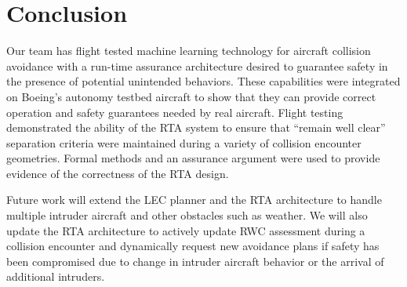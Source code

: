 \section{Conclusion}

%
%


Our team has flight tested machine learning technology for aircraft collision avoidance with a
run-time assurance architecture desired to guarantee safety in the presence of potential
unintended behaviors.  These capabilities were integrated on Boeing's
autonomy testbed aircraft to show that they can provide correct operation and
safety guarantees needed by real aircraft.  Flight testing demonstrated the ability of the RTA
system to ensure that ``remain well clear'' separation criteria were maintained during a variety of 
collision encounter geometries.  Formal methods and an assurance argument were used to 
provide evidence of the correctness of the RTA design. 

Future work will extend the LEC planner and the RTA architecture to handle multiple intruder 
aircraft and other obstacles such as weather.  We will also update the RTA architecture to 
actively update RWC assessment during a collision encounter and dynamically request
new avoidance plans if safety has been compromised due to change in intruder aircraft behavior 
or the arrival of additional intruders.  
